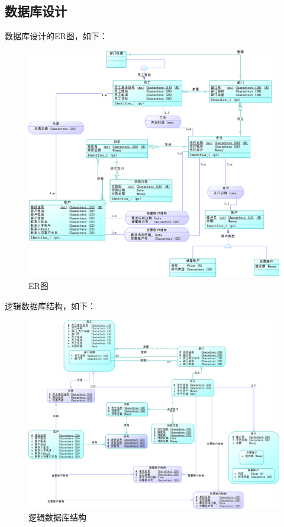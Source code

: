 \documentclass{ctexart}
\begin{document}
\subsection{\hei 数据库设计}
数据库设计的ER图，如下：
\begin{figure}[H]
    \centering
    \includegraphics[scale=0.7]{er.png}
    \caption{ER图}
\end{figure}
逻辑数据库结构，如下：
\begin{figure}[H]
    \centering
    \includegraphics[scale=0.6]{logi.png}
    \caption{逻辑数据库结构}
\end{figure}
\end{document}
